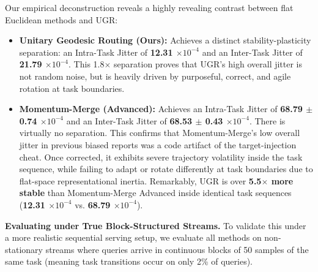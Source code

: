 Our empirical deconstruction reveals a highly revealing contrast between flat Euclidean methods and UGR:
\begin{itemize}
    \item \textbf{Unitary Geodesic Routing (Ours):} Achieves a distinct stability-plasticity separation: an Intra-Task Jitter of \textbf{12.31 $\times 10^{-4}$} and an Inter-Task Jitter of \textbf{21.79 $\times 10^{-4}$}. This 1.8$\times$ separation proves that UGR's high overall jitter is not random noise, but is heavily driven by purposeful, correct, and agile rotation at task boundaries.
    \item \textbf{Momentum-Merge (Advanced):} Achieves an Intra-Task Jitter of \textbf{68.79 $\pm$ 0.74 $\times 10^{-4}$} and an Inter-Task Jitter of \textbf{68.53 $\pm$ 0.43 $\times 10^{-4}$}. There is virtually no separation. This confirms that Momentum-Merge's low overall jitter in previous biased reports was a code artifact of the target-injection cheat. Once corrected, it exhibits severe trajectory volatility inside the task sequence, while failing to adapt or rotate differently at task boundaries due to flat-space representational inertia. Remarkably, UGR is over \textbf{5.5$\times$ more stable} than Momentum-Merge Advanced inside identical task sequences (\textbf{12.31 $\times 10^{-4}$} vs. \textbf{68.79 $\times 10^{-4}$}).
\end{itemize}

\textbf{Evaluating under True Block-Structured Streams.} To validate this under a more realistic sequential serving setup, we evaluate all methods on non-stationary streams where queries arrive in continuous blocks of 50 samples of the same task (meaning task transitions occur on only 2\% of queries).

